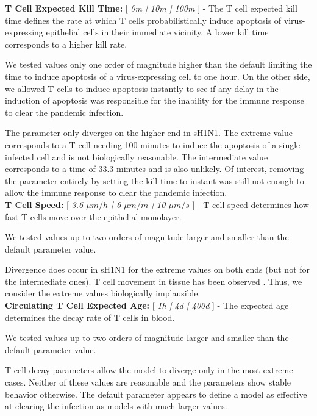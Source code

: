 \documentclass[preprint,10pt,authoryear]{elsarticle}
\begin{document}
\textbf{T Cell Expected Kill Time:} [ \textit{0m | 10m | 100m} ]  - The T cell expected kill time defines the rate at which T cells probabilistically induce apoptosis of  virus-expressing epithelial cells in their immediate vicinity.  A lower kill time corresponds to a higher kill rate. 

We tested values only one order of magnitude higher than the default limiting the time to induce apoptosis of a virus-expressing cell to one hour.  On the other side, we allowed T cells to induce apoptosis instantly to see if any delay in the induction of apoptosis was responsible for the inability for the immune response to clear the pandemic infection.

The parameter only diverges on the higher end in sH1N1.  The extreme value corresponds to a T cell needing 100 minutes to induce the apoptosis of a single infected cell and is not biologically reasonable.  The intermediate value corresponds to a time of 33.3 minutes and is also unlikely.  Of interest, removing the parameter entirely by setting the kill time to instant was still not enough to allow the immune response to clear the pandemic infection. \\


\textbf{T Cell Speed:} [ \textit{3.6 $\mu m/h$ | 6 $\mu m/m$ | 10 $\mu m/s$} ] - T cell speed determines how fast T cells move over the epithelial monolayer.

We tested values up to two orders of magnitude larger and smaller than the default parameter value.

Divergence does occur in sH1N1 for the extreme values on both ends (but not for the intermediate ones).  T cell movement in tissue has been observed \citep{Egen2011}.  Thus, we consider the extreme values biologically implausible.  \\


\textbf{Circulating T Cell Expected Age:} [ \textit{1h |  4d | 400d} ] - The expected age determines the decay rate of T cells in blood.  

We tested values up to two orders of magnitude larger and smaller than the default parameter value.

T cell decay parameters allow the model to diverge only in the most extreme cases.  Neither of these values are reasonable and the parameters show stable behavior otherwise.  The default parameter appears to define a model as effective at clearing the infection as models with much larger values. \\
\end{document}
